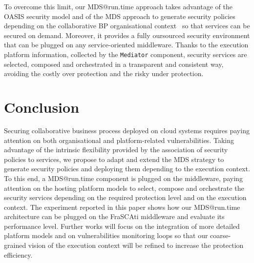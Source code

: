 \documentclass[runningheads,a4paper]{llncs}
\begin{document}
To overcome this limit, our MDS@run.time approach takes advantage of the OASIS security model and of the MDS approach to generate security policies depending on the collaborative BP organisational context~\cite{OFG13} so that services can be secured on demand. Moreover, it provides a fully oursourced security environment that can be plugged on any service-oriented middleware. Thanks to the execution platform information, collected by the \texttt{Mediator} component, security services are selected, composed and orchestrated in a transparent and consistent way, avoiding the costly over protection and the risky under protection.


\section{Conclusion}
Securing collaborative business process deployed on cloud systems requires paying attention on both organisational and platform-related vulnerabilities. Taking advantage of the intrinsic flexibility provided by the association of security policies to services, we propose to adapt and extend the MDS strategy to generate security policies and deploying them depending to the execution context. To this end, a MDS@run.time component is plugged on the middleware, paying attention on the hosting platform models to select, compose and orchestrate the security services depending on the required protection level and on the execution context.  The experiment reported in this paper shows how our MDS@run.time architecture can be plugged on the FraSCAti middleware and evaluate its performance level.
Further works will focus on the integration of more detailed platform models and on vulnerabilities monitoring loops so that our coarse-grained vision of the execution context will be refined to increase the protection efficiency.



 
  
\end{document}
